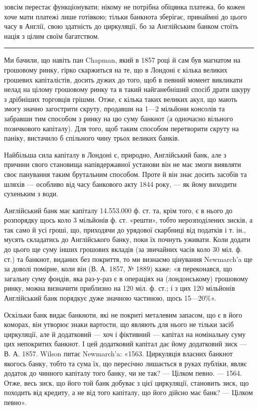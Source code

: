 \parcont{}  %
зовсім перестає функціонувати; нікому не потрібна обіцянка платежа, бо кожен
хоче мати платежі лише готівкою; тільки банкнота зберігає, принаймні до цього
часу в Англії, свою здатність до циркуляції, бо за Англійським банком стоїть
нація з цілим своїм багатством.

\pfbreak

Ми бачили, що навіть пан Chapman, який в 1857 році й сам був магнатом
на грошовому ринку, гірко скаржиться на те, що в Лондоні є кілька великих
грошевих капіталістів, досить дужих до того, щоб в певний момент викликати
нелад на цілому грошовому ринку та в такий найганебніший спосіб драти шкуру
з дрібніших торговців грішми. Отже, є кілька таких великих акул, що мають
змогу значно загострити скруту, продавши на 1—2 мільйони консолів та забравши
тим способом з ринку на цю суму банкнот (а одночасно вільного позичкового
капіталу). Для того, щоб таким способом перетворити скруту на паніку,
вистачило б спільного чину трьох великих банків.

Найбільша сила капіталу в Лондоні є, природно, Англійський банк, але
з причини свого становища напівдержавної установи він не має змоги виявляти
своє панування таким брутальним способом. Проте й він знає досить засобів
та шляхів — особливо від часу банкового акту 1844 року, — як йому виходити
сухеньким з води.

Англійський банк має капіталу 14.553.000 ф. ст. та, крім того, є в нього
до розпорядку щось коло 3 мільйонів ф. ст. «решти», тобто нерозподілених зисків,
а так само й усі гроші, що, приходячи до урядової скарбниці від податків
і т. ін., мусять складатись до Англійського банку, поки їх почнуть уживати.
Коли додати до цього ще суму інших грошових вкладів (за звичайних часів
коло 30 міл. ф. ст.) та банкнот, виданих без покриття, то ми визнаємо цінування
Newmarch’a ще за доволі помірне, коли він (В. А. 1857, № 1889)
каже: «я переконався, що загальну суму фондів, яка раз-у-раз є в операціях
на (лондонському) грошовому ринку, можна визначити приблизно на 120 міл.
ф. ст.; і з цих 120 мільйонів Англійський банк порядкує дуже значною частиною,
щось 15—20\%».

Оскільки банк видає банкноти, які не покриті металевим запасом, що є в його
коморах, він утворює знаки вартости, що являють для нього не тільки засіб циркуляції,
але й додатковий — хоч і фіктивний — капітал на номінальну суму цих непокритих
банкнот. І цей додатковий капітал дає йому додатковий зиск — В. А. 1857.
Wilson питає Newmarch’a: «1563. Циркуляція власних банкнот якогось банку,
тобто та сума їх, що пересічно лишається в руках публіки, являє додаток до
чинного капіталу того банку, чи не так? — Цілком певно. — 1564. Отже, весь
зиск, що його той банк добуває з цієї циркуляції, становить зиск, що походить
від кредиту, а не від того капіталу, що його дійсно має банк? — Цілком певно».

